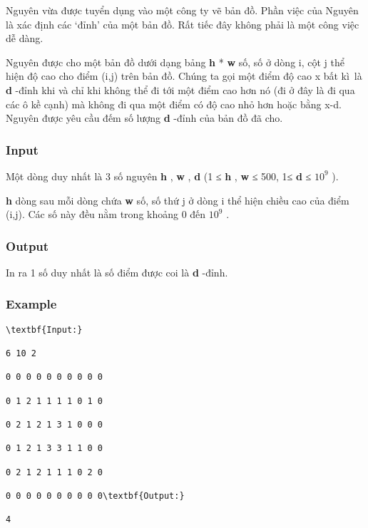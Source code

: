 



   Nguyên vừa được tuyển dụng vào một công ty vẽ bản đồ. Phần việc của Nguyên là xác định các ‘đỉnh’ của một bản đồ. Rất tiếc đây không phải là một công việc dễ dàng.  

   Nguyên được cho một bản đồ dưới dạng bảng   \textbf{    h   }   *   \textbf{    w   }   số, số ở dòng i, cột j thể hiện độ cao cho điểm (i,j) trên bản đồ. Chúng ta gọi một điểm độ cao x bất kì là   \textbf{    d   }   -đỉnh khi và chỉ khi không thể đi tới một điểm cao hơn nó (đi ở đây là đi qua các ô kề cạnh) mà không đi qua một điểm có độ cao nhỏ hơn hoặc bằng x-d. Nguyên được yêu cầu đếm số lượng   \textbf{    d   }   -đỉnh của bản đồ đã cho.  

\subsubsection{   Input  }

   Một dòng duy nhất là 3 số nguyên   \textbf{    h   }   ,   \textbf{    w   }   ,   \textbf{    d   }   (1 ≤   \textbf{    h   }   ,   \textbf{    w   }   ≤ 500, 1≤   \textbf{    d   }   ≤ $10^{9}$   ).  

\textbf{    h   }   dòng sau mỗi dòng chứa   \textbf{    w   }   số, số thứ j ở dòng i thể hiện chiều cao của điểm (i,j). Các số này đều nằm trong khoảng 0 đến $10^{9}$   .  

\subsubsection{   Output  }

   In ra 1 số duy nhất là số điểm được coi là   \textbf{    d   }   -đỉnh.  

\subsubsection{   Example  }
\begin{verbatim}
\textbf{Input:}

6 10 2

0 0 0 0 0 0 0 0 0 0

0 1 2 1 1 1 1 0 1 0

0 2 1 2 1 3 1 0 0 0

0 1 2 1 3 3 1 1 0 0

0 2 1 2 1 1 1 0 2 0

0 0 0 0 0 0 0 0 0 0\textbf{Output:}

4\end{verbatim}
